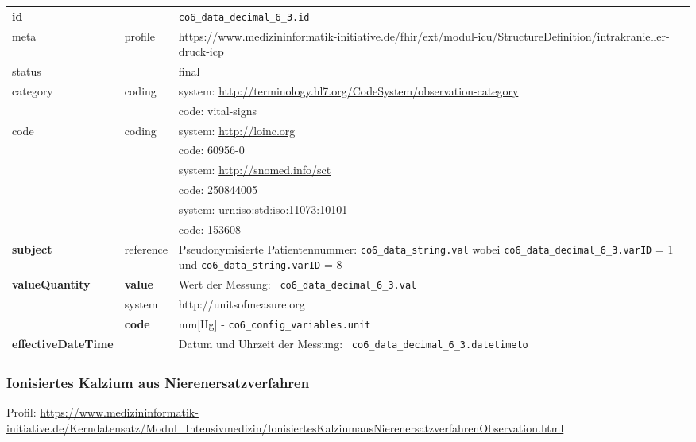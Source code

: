 \begin{longtable}{|l|l|p{7.5cm}|}
        \hline
        \rowcolor{lightgray} \multicolumn{3}{|l|}{Data Mapping (inhaltlich)} \\ \hline
        \textbf{id} &  & \texttt{co6\_data\_decimal\_6\_3.id} \\ \hline
	meta & profile & https://www.medizininformatik-initiative.de/fhir/ext/modul-icu/StructureDefinition/intrakranieller-druck-icp \\ \hline 
	status &  & final   \\ \hline 
	category & coding & system: \url{http://terminology.hl7.org/CodeSystem/observation-category} \\
\cline{3-3}
	& & code: vital-signs \\ \hline
	code & coding & system: \url{http://loinc.org} \\ 
	\cline{3-3} 
	&  & code: 60956-0 \\ 
	\cline{3-3} 
	&  & system: \url{http://snomed.info/sct} \\ 
	\cline{3-3}
	&  & code: 250844005 \\
	\cline{3-3} 
	&  & system: urn:iso:std:iso:11073:10101 \\ 
	\cline{3-3}
	&  & code: 153608 \\ \hline
	 \textbf{subject} & reference & Pseudonymisierte Patientennummer: \texttt{co6\_data\_string.val} wobei \texttt{co6\_data\_decimal\_6\_3.varID} = 1 und \texttt{co6\_data\_string.varID} = 8 \\ \hline
	 \textbf{valueQuantity}  & \textbf{value} & Wert der Messung: \texttt{
co6\_data\_decimal\_6\_3.val} \\
        \cline{2-3}
         & system & http://unitsofmeasure.org \\
         \cline{2-3}
         & \textbf{code} & mm[Hg] - \texttt{co6\_config\_variables.unit} \\ \hline
     \textbf{effectiveDateTime}  & & Datum und Uhrzeit der Messung: \texttt{
co6\_data\_decimal\_6\_3.datetimeto} \\
     \hline
\end{longtable}

\subsubsection{Ionisiertes Kalzium aus Nierenersatzverfahren} 
Profil: \url{https://www.medizininformatik-initiative.de/Kerndatensatz/Modul_Intensivmedizin/IonisiertesKalziumausNierenersatzverfahrenObservation.html}


